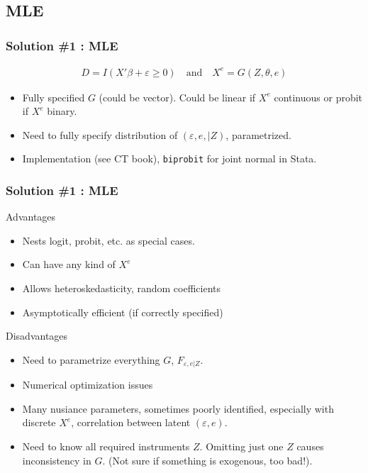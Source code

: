 \subsection{MLE}

\begin{frame}
\frametitle{Solution \#1 : MLE}
\begin{eqnarray*}
D = I ( X' \beta + \varepsilon \geq 0 ) \quad \mbox{and} \quad X^e = G(Z,\theta,e)
\end{eqnarray*}
\begin{itemize}
\item Fully specified $G$ (could be vector). Could be linear if $X^e$ continuous or probit if $X^e$ binary.
\item Need to fully specify distribution of $(\varepsilon,e, | Z)$, parametrized.
\item Implementation (see CT book), \texttt{biprobit} for joint normal in Stata.
\end{itemize}
\end{frame}


\begin{frame}
\frametitle{Solution \#1 : MLE}

\begin{block}{Advantages}
\begin{itemize}
\item Nests logit, probit, etc. as special cases.
\item Can have any kind of $X^e$
\item Allows heteroskedasticity, random coefficients
\item Asymptotically efficient (if correctly specified)
\end{itemize}
\end{block}

\begin{block}{Disadvantages}
\begin{itemize}
\item Need to parametrize everything $G$, $F_{\varepsilon,e|Z}$.
\item Numerical optimization issues
\item Many nusiance parameters, sometimes poorly identified, especially with discrete $X^e$, correlation between latent $(\varepsilon,e)$.
\item Need to know all required instruments $Z$. Omitting just one $Z$ causes inconsistency in $G$. (Not sure if something is exogenous, too bad!).
\end{itemize}
\end{block}
\end{frame}

